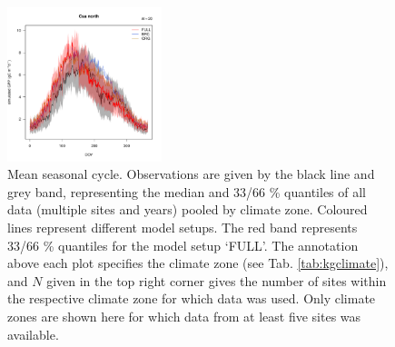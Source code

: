 \documentclass{myreport}
\begin{document}
\begin{figure}[!ht]
\includegraphics[width=0.4\textwidth]{fig/meandoy_byzone_Csanorth_all.pdf}
    \caption{Mean seasonal cycle. Observations are given by the black line and grey band, representing the median and 33/66 \% quantiles of all data (multiple sites and years) pooled by climate zone. Coloured lines represent different model setups. The red band represents 33/66 \% quantiles for the model setup `FULL'. The annotation above each plot specifies the climate zone (see Tab. \ref{tab:kgclimate}), and $N$ given in the top right corner gives the number of sites within the respective climate zone for which data was used. Only climate zones are shown here for which data from at least five sites was available.}
    \label{fig:season}
\end{figure}
\end{document}

